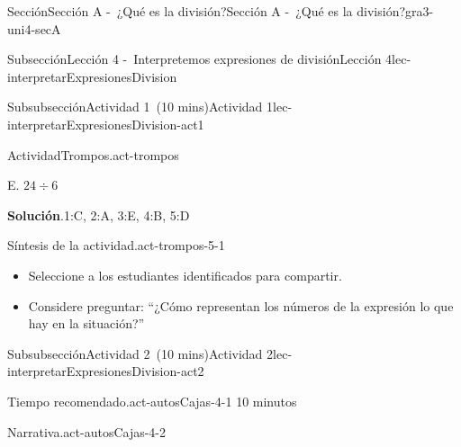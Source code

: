 \documentclass[oneside,10pt,]{article}
\newcommand{\blocktitlefont}{\relax}
\begin{document}
\begin{sectionptx}{Sección}{Sección A -~¿Qué es la división?}{}{Sección A -~¿Qué es la división?}{}{}{gra3-uni4-secA}
\begin{subsectionptx}{Subsección}{Lección 4 -~Interpretemos expresiones de división}{}{Lección 4}{}{}{lec-interpretarExpresionesDivision}
\begin{subsubsectionptx}{Subsubsección}{Actividad 1~(10 mins)}{}{Actividad 1}{}{}{lec-interpretarExpresionesDivision-act1}
\begin{activity}{Actividad}{Trompos.}{act-trompos}
\begin{sidebyside}{2}{0.05}{0}{0.15}
\begin{sbspanel}{0.2}%
\par
E. \(24 \div 6\)%
\end{sbspanel}%
\end{sidebyside}%
\par\smallskip%
\noindent\textbf{\blocktitlefont Solución}.\hypertarget{act-trompos-3}{}\quad{}1:C, 2:A, 3:E, 4:B, 5:D%
\end{activity}%
%
%
%
%
%
\par
\begin{paragraphs}{Síntesis de la actividad.}{act-trompos-5-1}%
%
\begin{itemize}[label=\textbullet]
\item{}Seleccione a los estudiantes identificados para compartir.%
\item{}Considere preguntar: ``¿Cómo representan los números de la expresión lo que hay en la situación?''%
\end{itemize}
\end{paragraphs}%
\end{subsubsectionptx}
%
%
\typeout{************************************************}
\typeout{************************************************}
%
\begin{subsubsectionptx}{Subsubsección}{Actividad 2~(10 mins)}{}{Actividad 2}{}{}{lec-interpretarExpresionesDivision-act2}
\par
\begin{paragraphs}{Tiempo recomendado.}{act-autosCajas-4-1}%
10 minutos%
\end{paragraphs}%
\begin{paragraphs}{Narrativa.}{act-autosCajas-4-2}%

\end{paragraphs}
\end{subsubsectionptx}
\end{subsectionptx}
\end{sectionptx}
\end{document}
